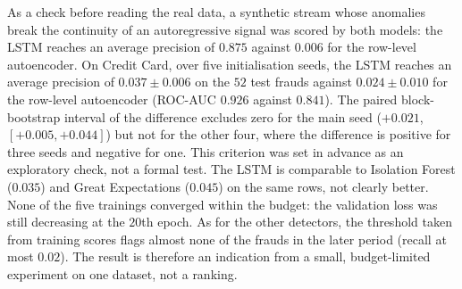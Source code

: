 \documentclass[conference]{IEEEtran}
\begin{document}
As a check before reading the real data, a synthetic stream whose anomalies
break the continuity of an autoregressive signal was scored by both models: the
LSTM reaches an average precision of $0.875$ against $0.006$ for the
row-level autoencoder. On Credit Card, over five initialisation seeds, the LSTM
reaches an average precision of $0.037 \pm 0.006$ on the $52$ test frauds
against $0.024 \pm 0.010$ for the row-level autoencoder (ROC-AUC $0.926$
against $0.841$). The paired block-bootstrap interval of the difference excludes
zero for the main seed ($+0.021$, $[+0.005, +0.044]$) but not for the other
four, where the difference is positive for three seeds and negative for one.
This criterion was set in advance as an exploratory check, not a formal test.
The LSTM is comparable to Isolation Forest ($0.035$) and Great Expectations
($0.045$) on the same rows, not clearly better. None of the five trainings
converged within the budget: the validation loss was still decreasing at the
$20$th epoch. As for the other detectors, the threshold taken from training
scores flags almost none of the frauds in the later period (recall at most
$0.02$). The result is therefore an indication from a small, budget-limited
experiment on one dataset, not a ranking.




\end{document}

